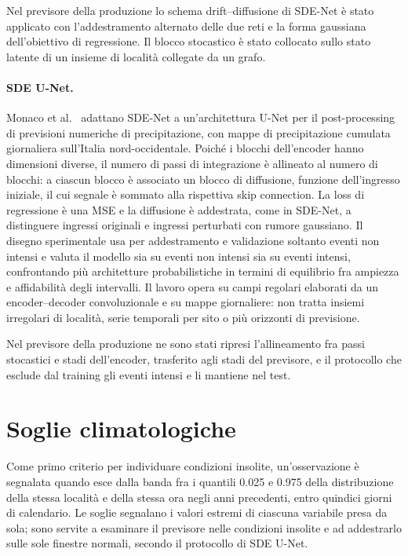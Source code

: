Nel previsore della produzione lo schema drift--diffusione di SDE-Net è stato applicato con l'addestramento alternato delle due reti e la forma gaussiana dell'obiettivo di regressione. Il blocco stocastico è stato collocato sullo stato latente di un insieme di località collegate da un grafo.

\paragraph{SDE U-Net.}
Monaco et al.~\cite{monaco2025sdeunet} adattano SDE-Net a un'architettura U-Net per il post-processing di previsioni numeriche di precipitazione, con mappe di precipitazione cumulata giornaliera sull'Italia nord-occidentale. Poiché i blocchi dell'encoder hanno dimensioni diverse, il numero di passi di integrazione è allineato al numero di blocchi: a ciascun blocco è associato un blocco di diffusione, funzione dell'ingresso iniziale, il cui segnale è sommato alla rispettiva skip connection. La loss di regressione è una MSE e la diffusione è addestrata, come in SDE-Net, a distinguere ingressi originali e ingressi perturbati con rumore gaussiano. Il disegno sperimentale usa per addestramento e validazione soltanto eventi non intensi e valuta il modello sia su eventi non intensi sia su eventi intensi, confrontando più architetture probabilistiche in termini di equilibrio fra ampiezza e affidabilità degli intervalli. Il lavoro opera su campi regolari elaborati da un encoder--decoder convoluzionale e su mappe giornaliere: non tratta insiemi irregolari di località, serie temporali per sito o più orizzonti di previsione.

Nel previsore della produzione ne sono stati ripresi l'allineamento fra passi stocastici e stadi dell'encoder, trasferito agli stadi del previsore, e il protocollo che esclude dal training gli eventi intensi e li mantiene nel test.

\section{Soglie climatologiche}
\label{app:pvgis-soglie}

Come primo criterio per individuare condizioni insolite, un'osservazione è segnalata quando esce dalla banda fra i quantili 0.025 e 0.975 della distribuzione della stessa località e della stessa ora negli anni precedenti, entro quindici giorni di calendario. Le soglie segnalano i valori estremi di ciascuna variabile presa da sola; sono servite a esaminare il previsore nelle condizioni insolite e ad addestrarlo sulle sole finestre normali, secondo il protocollo di SDE U-Net.

